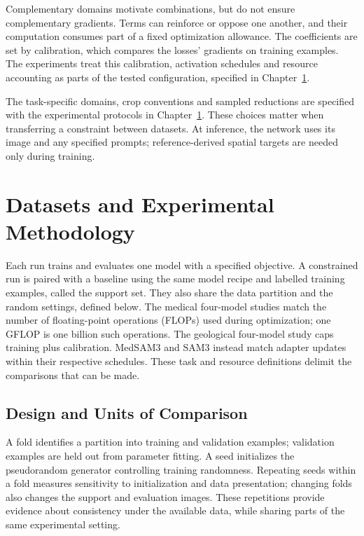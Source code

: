 \documentclass[12pt,a4paper]{article}
\begin{document}
Complementary domains motivate combinations, but do not ensure complementary
gradients. Terms can reinforce or oppose one another, and their computation
consumes part of a fixed optimization allowance. The coefficients are set by
calibration, which compares the losses' gradients on training examples. The
experiments treat this calibration, activation schedules and resource
accounting as parts of the tested configuration, specified in
Chapter~\ref{sec:methodology}.

The task-specific domains, crop conventions and sampled reductions
are specified with the experimental protocols in
Chapter~\ref{sec:methodology}. These choices matter when transferring a
constraint between datasets. At inference, the network uses its image
and any specified prompts; reference-derived spatial targets are needed
only during training.

\clearpage
\section{Datasets and Experimental Methodology}
\label{sec:methodology}

Each run trains and evaluates one model with a specified objective. A
constrained run is paired with a baseline using the same model recipe and
labelled training examples, called the support set. They also share the data
partition and the random settings, defined below. The medical four-model
studies match the number of floating-point operations (FLOPs) used during
optimization; one GFLOP is one billion such operations. The geological
four-model study caps training plus calibration. MedSAM3 and SAM3 instead
match adapter updates within their respective schedules. These task and
resource definitions delimit the comparisons that can be made.

\subsection{Design and Units of Comparison}
\label{sec:experimental-structure}

A fold identifies a partition into training and validation examples;
validation examples are held out from parameter fitting. A seed initializes
the pseudorandom generator controlling training randomness. Repeating seeds
within a fold measures sensitivity to initialization and data presentation;
changing folds also changes the support and evaluation images. These
repetitions provide evidence about consistency under the available data,
while sharing parts of the same experimental setting.
\end{document}
